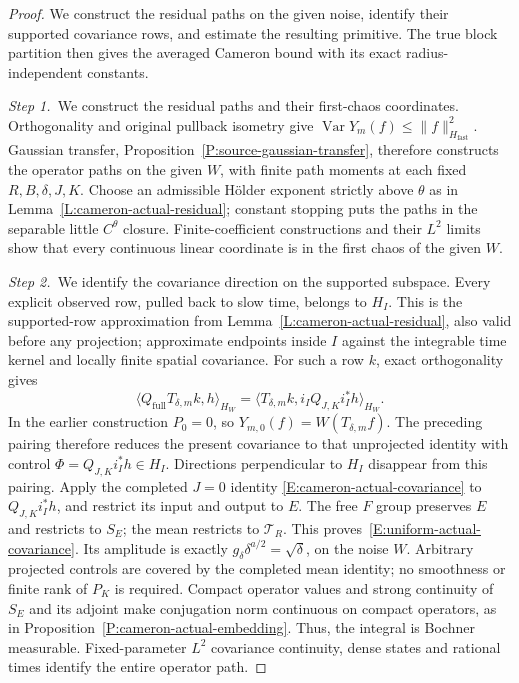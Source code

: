 \begin{proof}
  We construct the residual paths on the given noise, identify their supported
  covariance rows, and estimate the resulting primitive. The true block
  partition then gives the averaged Cameron bound with its exact
  radius-independent constants.


  \medskip
  \noindent\textit{Step 1.~}We construct the residual paths and their
  first-chaos coordinates.
  Orthogonality and original pullback isometry give $\operatorname{Var}Y_m(f)
  \le \|f\|_{H_{\mathrm{fast}}}^2$. Gaussian transfer,
  Proposition~\ref{P:source-gaussian-transfer}, therefore constructs the
  operator paths on the given $W$, with finite path moments at each fixed
  $R,B,\delta,J,K$. Choose an admissible H\"older exponent strictly above
  $\theta$ as in Lemma~\ref{L:cameron-actual-residual}; constant stopping puts
  the paths in the separable little $C^\theta$ closure. Finite-coefficient
  constructions and their $L^2$ limits show that every continuous linear
  coordinate is in the first chaos of the given $W$.


  \medskip
  \noindent\textit{Step 2.~}We identify the covariance direction on the
  supported subspace.
  Every explicit observed row, pulled back to slow time, belongs to $H_I$. This
  is the supported-row approximation from Lemma~\ref{L:cameron-actual-residual},
  also valid before any projection; approximate endpoints inside $I$ against the
  integrable time kernel and locally finite spatial covariance. For such a row
  $k$, exact orthogonality gives
  \[
    \langle Q_{\mathrm{full}}T_{\delta,m}k,h\rangle_{H_W}
    =\langle T_{\delta,m}k,i_IQ_{J,K}i_I^*h\rangle_{H_W}.
  \]
  In the earlier construction $P_0=0$, so
  $Y_{m,0}(f)=W(T_{\delta,m}f)$.
  The preceding pairing therefore reduces the present covariance to that
  unprojected identity with control $\Phi=Q_{J,K}i_I^*h\in H_I$.
  Directions perpendicular to $H_I$ disappear from this pairing. Apply the
  completed $J = 0$ identity \eqref{E:cameron-actual-covariance} to
  $Q_{J,K}i_I^*h$, and restrict its input and output to $E$. The free $F$ group
  preserves $E$ and restricts to $S_E$; the mean restricts to $\mathcal{T}_R$.
  This proves~\eqref{E:uniform-actual-covariance}. Its amplitude is exactly
  $g_\delta\delta^{a/2} = \sqrt\delta$, on the noise $W$. Arbitrary projected
  controls are covered by the completed mean identity; no smoothness or finite
  rank of $P_K$ is required. Compact operator values and strong continuity of
  $S_E$ and its adjoint make conjugation norm continuous on compact operators,
  as in Proposition~\ref{P:cameron-actual-embedding}. Thus, the integral is
  Bochner measurable. Fixed-parameter $L^2$ covariance continuity, dense states
  and rational times identify the entire operator path.



\end{proof}
